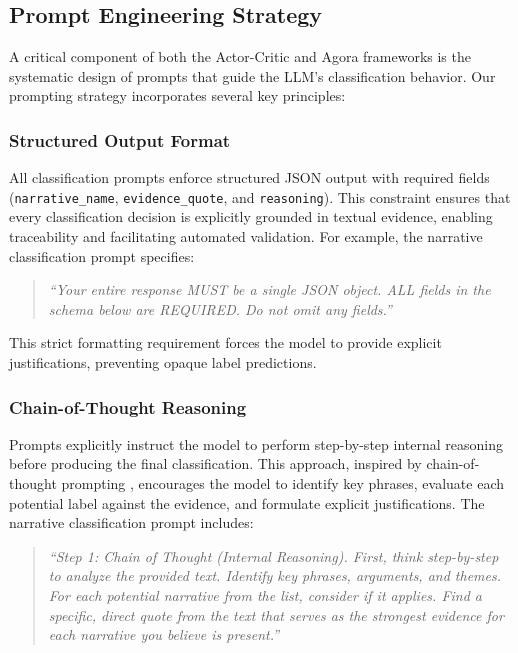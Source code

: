 \subsection{Prompt Engineering Strategy}

A critical component of both the Actor-Critic and Agora frameworks is the systematic design of prompts that guide the LLM's classification behavior. Our prompting strategy incorporates several key principles:

\subsubsection{Structured Output Format}

All classification prompts enforce structured JSON output with required fields (\texttt{narrative\_name}, \texttt{evidence\_quote}, and \texttt{reasoning}). This constraint ensures that every classification decision is explicitly grounded in textual evidence, enabling traceability and facilitating automated validation. For example, the narrative classification prompt specifies:

\begin{quote}
\textit{``Your entire response MUST be a single JSON object. ALL fields in the schema below are REQUIRED. Do not omit any fields.''}
\end{quote}

\noindent This strict formatting requirement forces the model to provide explicit justifications, preventing opaque label predictions.

\subsubsection{Chain-of-Thought Reasoning}

Prompts explicitly instruct the model to perform step-by-step internal reasoning before producing the final classification. This approach, inspired by chain-of-thought prompting \citep{wei2022chain}, encourages the model to identify key phrases, evaluate each potential label against the evidence, and formulate explicit justifications. The narrative classification prompt includes:

\begin{quote}
\textit{``Step 1: Chain of Thought (Internal Reasoning). First, think step-by-step to analyze the provided text. Identify key phrases, arguments, and themes. For each potential narrative from the list, consider if it applies. Find a specific, direct quote from the text that serves as the strongest evidence for each narrative you believe is present.''}
\end{quote}

